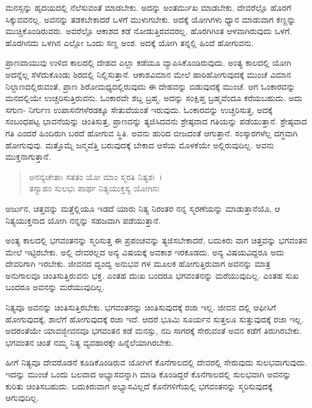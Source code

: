 ಮನಸ್ಸನ್ನು ಹೃದಯದಲ್ಲಿ ನೆಲೆಸುವಂತೆ ಮಾಡಬೇಕು. ಅದನ್ನು ಅಂತರ್ಮುಖ ಮಾಡಬೇಕು. ದೇವರೆಲ್ಲೊ ಹೊರಗೆ ಸಿಕ್ಕುವವನಲ್ಲ. ಅವನನ್ನು ತಡಕಬೇಕಾದರೆ ಒಳಗೆ ಮುಳುಗಬೇಕು. ಅದಕ್ಕೆ ಯೋಗಿಗಳು ಧ್ಯಾನ ಮಾಡುವಾಗ ಕಣ್ಣನ್ನು ಮುಚ್ಚಿಕೊಂಡಿರುವರು. ಅವರೆಲ್ಲೊ ಆಕಾಶದ ಕಡೆ ನೋಡುತ್ತಿರವವರಲ್ಲ. ಹೊರಗಿಗಿಂತ ಆಳವಾಗಿರುವುದು ಒಳಗೆ. ಹೊರಗಿನದು ಒಳಗಿನ ಎಲ್ಲೋ ಒಂದು ಸಣ್ಣ ಅಂಶ. ಅದಕ್ಕೆ ಯೋಗಿ ತನ್ನಲ್ಲಿ ಹಿಂದೆ ಹೋಗುವನು.

ಪ್ರಾಣವಾಯುವು ಉಳಿದ ಕಾಲದಲ್ಲಿ ದೇಹದ ಎಲ್ಲಾ ಕಡೆಯೂ ವ್ಯಾಪಿಸಿಕೊಂಡಿರುವುದು. ಅಂತ್ಯ ಕಾಲದಲ್ಲಿ ಯೋಗಿ ಅದನ್ನೆಲ್ಲ ಸೆಳೆದುಕೊಂಡು ಶಿರದಲ್ಲಿ ನಿಲ್ಲಿಸುತ್ತಾನೆ. ಆಕಾಶವಿಮಾನ ಮೇಲೆ ಹಾರಿಹೋಗುವುದಕ್ಕೆ ಮುಂಚೆ ವಿಮಾನ ನಿಲ್ದಾಣದಲ್ಲಿರುವಂತೆ, ಪ್ರಾಣ ಶಿರೋಮಧ್ಯದಲ್ಲಿರುವುದು ಈ ದೇಹವನ್ನು ಬಿಡುವುದಕ್ಕೆ ಮುಂಚೆ. ಆಗ ಓಂಕಾರವನ್ನು ಮನದಲ್ಲಿಯೇ ಉಚ್ಚರಿಸುತ್ತಿರುವನು. ಓಂಕಾರವೇ ಶಬ್ದ ಬ್ರಹ್ಮ. ಅದನ್ನು ಸಂಕ್ಷಿಪ್ತ ಬ್ರಹ್ಮವೆಂದೂ ಕರೆಯಬಹುದು. ಅದು ಸಗುಣ- ನಿರ್ಗುಣ ಉಪಾಸನೆಗಳೆರಡಕ್ಕೂ ಸೇತುವೆಯಂತೆ ಇರುವುದು. ಓಂಕಾರವನ್ನು ಉಚ್ಚರಿಸುತ್ತ, ಅದಕ್ಕೆ ಸಂಬಂಧಪಟ್ಟ ಭಾವನೆಯನ್ನು ಚಿಂತಿಸುತ್ತ, ಪ್ರಾಣವನ್ನು ತ್ಯಜಿಸಿದವನು ಶ್ರೇಷ್ಠವಾದ ಗತಿಯನ್ನು ಪಡೆಯುತ್ತಾನೆ. ಶ್ರೇಷ್ಠವಾದ ಗತಿ ಎಂದರೆ ಹಿಂದಿರುಗಿ ಬರದೆ ಹೋಗುವ ಸ್ಥಿತಿ. ಅವನು ಹುರಿದ ಬೀಜದಂತೆ ಆಗುತ್ತಾನೆ. ಸಂಸ್ಕಾರಗಳೆಲ್ಲ ದಗ್ಧವಾಗಿ ಹೋಗುವುವು. ಮತ್ತೊಮ್ಮೆ ಜನ್ಮವೆತ್ತಿ ಬರುವುದಕ್ಕೆ ಬೇಕಾದ ಆಸೆಯ ಮೊಳಕೆಯೇ ಅಲ್ಲಿರುವುದಿಲ್ಲ. ಅವನು ಮುಕ್ತನಾಗುತ್ತಾನೆ.

\begin{verse}
ಅನನ್ಯಚೇತಾಃ ಸತತಂ ಯೋ ಮಾಂ ಸ್ಮರತಿ ನಿತ್ಯಶಃ~।\\ತಸ್ಯಾಹಂ ಸುಲಭಃ ಪಾರ್ಥ ನಿತ್ಯಯುಕ್ತಸ್ಯ ಯೋಗಿನಃ 
\end{verse}

{\small ಅರ್ಜುನ, ಚಿತ್ತವನ್ನು ಮತ್ತೆಲ್ಲಿಯೂ ಇಡದೆ ಯಾರು ನಿತ್ಯ ನಿರಂತರ ನನ್ನ ಸ್ಮರಣೆಯನ್ನು ಮಾಡುತ್ತಾನೆಯೊ, ಆ ನಿತ್ಯಯುಕ್ತನಾದ ಯೋಗಿ ನನ್ನನ್ನು ಸಹಜವಾಗಿ ಪಡೆಯುತ್ತಾನೆ.}

ಅಂತ್ಯ ಕಾಲದಲ್ಲಿ ಭಗವಂತನನ್ನು ಸ್ಮರಿಸುತ್ತ ಈ ಪ್ರಪಂಚವನ್ನು ತ್ಯಜಿಸಬೇಕಾದರೆ, ಬದುಕಿರು ವಾಗ ಚಿತ್ತವನ್ನು ಭಗವಂತನ ಮೇಲೆ ಇಟ್ಟಿರಬೇಕು. ಅಲ್ಲಿ ದೇವರಲ್ಲದ ಅನ್ಯ ವಿಷಯಕ್ಕೆ ಅವಕಾಶ ಇರಕೂಡದು. ಅನ್ಯ ವಿಷಯವಿದ್ದರೂ ಅದು ದೇವರಿಗಾಗಿ ಇರಬೇಕು. ಜೀವನದ ದ್ವಂದ್ವ ಅನುಭವ ಗಳ ಮೂಲಕ ಹೋಗುತ್ತಿರುವಾಗ ಅವನನ್ನು ಮಾತ್ರ ಅನುಗಾಲವೂ ಚಿಂತಿಸುತ್ತಿರುವನು ಭಕ್ತ. ಎಂತಹ ದುಃಖ ಬಂದರೂ ಭಗವಂತನನ್ನು ಮರೆಯುವುದಿಲ್ಲ. ಎಂತಹ ಸುಖ ಬಂದರೂ ಅವನನ್ನು ಮರೆಯುವುದಿಲ್ಲ.

ನಿತ್ಯವೂ ಅವನನ್ನು ಚಿಂತಿಸುತ್ತಿರಬೇಕು. ಭಗವಂತನನ್ನು ಚಿಂತಿಸುವುದಕ್ಕೆ ರಜಾ ಇಲ್ಲ. ಜೀವನ ದಲ್ಲಿ ಆಫೀಸಿಗೆ ಹೋಗುವುದಕ್ಕೆ, ಶಾಲೆಗೆ ಹೋಗುವುದಕ್ಕೆ ರಜಾ ಇದೆ. ಆದರೆ ಭೂಮಿ ಸೂರ್ಯನ ಸುತ್ತಲೂ ಸುತ್ತುವುದಕ್ಕೆ ರಜಾ ಇಲ್ಲ. ಅದರಂತೆಯೇ ಯಾವಜ್ಜೀವನವೂ ಭಗವಂತನ ಕಡೆ ಮನಸ್ಸು, ನದಿ ಸಾಗರಕ್ಕೆ ಸೇರುವಂತೆ ಅವನ ಕಡೆಗೆ ತಿರುಗಿರಬೇಕು. ಭಗವಂತನ ಚಿಂತೆ ನಮ್ಮ ನಿತ್ಯ ವ್ಯವಹಾರಕ್ಕೇ ಹಿನ್ನೆಲೆಯಾಗಿರಬೇಕು.

ಹೀಗೆ ನಿತ್ಯವೂ ದೇವರೊಡನೆ ಕೂಡಿಕೊಂಡಿರುವ ಯೋಗಿಗೆ ಕೊನೆಗಾಲದಲ್ಲಿ ದೇವರಲ್ಲಿ ಸೇರುವುದು ಸುಲಭವಾಗುವುದು. ಇದನ್ನು ಮುಂಚೆ ಒಂದು ಬಲವಾದ ಅಭ್ಯಾಸವನ್ನಾಗಿ ಮಾಡಿ ಕೊಂಡಿದ್ದರೆ ಕೊನೆಗಾಲದಲ್ಲಿ ಸುಲಭವಾಗಿ ಅವನನ್ನು ಕುರಿತು ಚಿಂತಿಸಬಹುದು. ಬದುಕಿರುವಾಗ ಅಭ್ಯಾಸವಿಲ್ಲದೆ ಕೊನೆಗಳಿಗೆಯಲ್ಲಿ ಭಗವಂತನನ್ನು ಸ್ಮರಿಸುವುದಕ್ಕೆ ಆಗುವುದಿಲ್ಲ.

